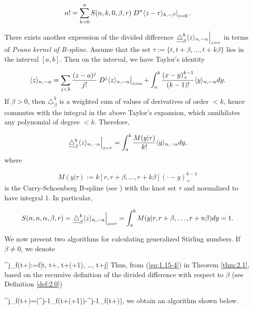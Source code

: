 \[
n! =\sum^n_{k=0} S(n,k,0,\beta,r) \left. D^n \langle z-r\rangle_{k,-\beta}\right|_{z=0}.
\]


There exists another expression of the divided difference $\left.\underline\triangle^k_\beta \langle z\rangle_{n,-\alpha}\right|_{z=r}$ in terms of {\it Peano kernel of B-spline}. Assume that the set $\tau:=\{ t, t+\beta,\ldots, t+k\beta\}$ lies in the interval $[a,b]$. Then on the interval, we have Taylor's identity

\[
\langle z\rangle_{n,-\alpha}=\sum_{j<k} \frac{(z-a)^j}{j!}\left. D^j \langle z\rangle_{n,-\alpha}\right|_{z=a}+\int^b_a\frac{(x-y)^{k-1}_+}{(k-1)!}
\langle y\rangle_{n,-\alpha} dy.
\]
If $\beta >0$, then $\underline\triangle^k_\beta$ is a weighted sum of values of derivatives of order $<k$, hence commutes with the integral in the above Taylor's expansion, which annihilates any polynomial of degree $< k$. Therefore,

\[
\left. \underline\triangle^k_\beta \langle z\rangle_{n,-\alpha}\right|_{z=r} =\int^b_a \frac{M(y| \tau)}{k!} \langle y\rangle_{n,-\alpha} dy,
\]
where

\[
M(y|\tau):=k [r,r+\beta,\ldots, r+k\beta] (\cdot -y)^{k-1}_+
\]
is the Curry-Schoenberg B-spline (see \cite{CS}) with the knot set $\tau$ and normalized to have integral $1$. In particular,

\[
S(n,n,\alpha, \beta,r)=\left. \underline\triangle^k_\beta \langle z\rangle_{n,-\alpha}\right|_{z=r}  =\int^b_aM(y| r, r+\beta, \ldots, r+n\beta) dy =1.
\]

\medbreak
We now present two algorithms for calculating generalized Stirling numbers. If $\beta\not=0$, we denote

\be\label{eq:no1}
\underline\triangle^j_\beta f(t+\ell\beta):=f[t, t+\ell \beta, t+(\ell +1)\beta, \ldots, t+j\beta]
\ee
Thus, from (\ref{eq:1.15-4}) in Theorem \ref{thm:2.1}, based on the recursive definition of the divided difference
with respect to $\beta$ (see Definition \ref{def:2.0})

\be\label{eq:no2}
\underline\triangle^j_\beta f(t+\ell \beta)=(\underline\triangle^{j-1}_\beta f(t+(\ell +1)\beta)-\underline\triangle^{j-1}_\beta f(t+\ell\beta)),
\ee
we obtain an algorithm shown below.

